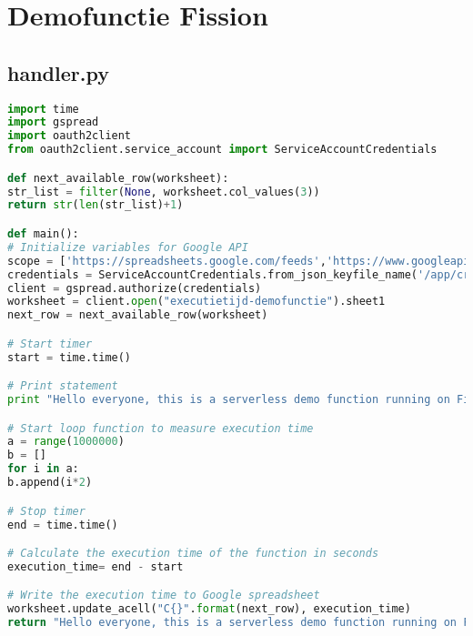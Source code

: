 \newpage
\section{Demofunctie Fission}
\subsection{handler.py}
\label{sec:demofunctie-fission}
\begin{lstlisting}[language=python]
import time
import gspread
import oauth2client
from oauth2client.service_account import ServiceAccountCredentials

def next_available_row(worksheet):
str_list = filter(None, worksheet.col_values(3))
return str(len(str_list)+1)

def main():   
# Initialize variables for Google API
scope = ['https://spreadsheets.google.com/feeds','https://www.googleapis.com/auth/drive']
credentials = ServiceAccountCredentials.from_json_keyfile_name('/app/credentials.json', scope)
client = gspread.authorize(credentials)
worksheet = client.open("executietijd-demofunctie").sheet1
next_row = next_available_row(worksheet)

# Start timer 
start = time.time()

# Print statement
print "Hello everyone, this is a serverless demo function running on Fission!"

# Start loop function to measure execution time
a = range(1000000)
b = []
for i in a:
b.append(i*2)

# Stop timer
end = time.time()

# Calculate the execution time of the function in seconds
execution_time= end - start

# Write the execution time to Google spreadsheet
worksheet.update_acell("C{}".format(next_row), execution_time)
return "Hello everyone, this is a serverless demo function running on Fission!"


\end{lstlisting}